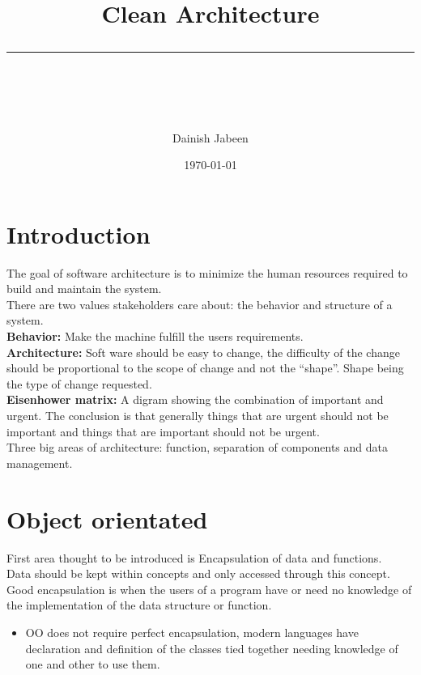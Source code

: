 \documentclass[11pt]{scrartcl} %
\title{	
	\normalfont\normalsize
	\vspace{20pt} %
	{\huge Clean Architecture}\\ %
	\vspace{12pt} %
	\rule{\linewidth}{2pt}\\ %
}
\author{\small Dainish Jabeen} %
\date{\normalsize\today} %
\begin{document}
\maketitle %

\tableofcontents

\pagebreak

\section{Introduction}

The goal of software architecture is to minimize the human resources
required to build and maintain the system.\\

There are two values stakeholders care about: the behavior and structure
of a system.\\

\textbf{Behavior:} Make the machine fulfill the users requirements.\\

\textbf{Architecture:} Soft ware should be easy to change, the
difficulty of the change should be proportional to the scope of change
and not the ``shape''. Shape being the type of change requested.\\

\textbf{Eisenhower matrix:} A digram showing the combination of
important and urgent. The conclusion is that generally things that are
urgent should not be important and things that are important should not
be urgent.\\

Three big areas of architecture: function, separation of components and
data management.

\section{Object orientated}

First area thought to be introduced is Encapsulation of data and
functions.\\

Data should be kept within concepts and only accessed through this
concept.\\

Good encapsulation is when the users of a program have or need no
knowledge of the implementation of the data structure or function.

\begin{itemize}
\item
  OO does not require perfect encapsulation, modern languages have
  declaration and definition of the classes tied together needing
  knowledge of one and other to use them.
\end{itemize}
\end{document}
